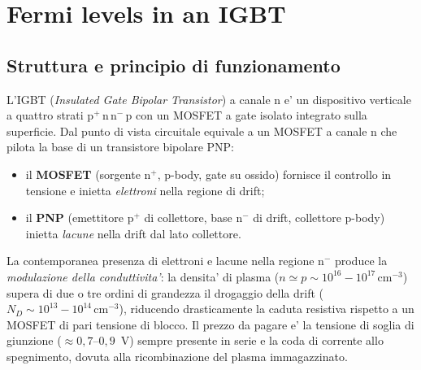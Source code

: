 \chapter{Fermi levels in an IGBT}
\label{ch:igbtfermi}
\vspace{-2.2\baselineskip}

\section{Struttura e principio di funzionamento}

L'IGBT (\emph{Insulated Gate Bipolar Transistor}) a canale n e' un dispositivo
verticale a quattro strati $\mathrm{p^{+}\,n\,n^{-}\,p}$ con un MOSFET a gate
isolato integrato sulla superficie. Dal punto di vista circuitale equivale a un
MOSFET a canale n che pilota la base di un transistore bipolare PNP:

\begin{itemize}[nosep,leftmargin=1.4em]
  \item il \textbf{MOSFET} (sorgente $\mathrm{n^{+}}$, p-body, gate su ossido)
        fornisce il controllo in tensione e inietta \emph{elettroni} nella
        regione di drift;
  \item il \textbf{PNP} (emettitore $\mathrm{p^{+}}$ di collettore, base
        $\mathrm{n^{-}}$ di drift, collettore p-body) inietta \emph{lacune}
        nella drift dal lato collettore.
\end{itemize}

La contemporanea presenza di elettroni e lacune nella regione $\mathrm{n^{-}}$
produce la \emph{modulazione della conduttivita'}: la densita' di plasma
($n \simeq p \sim 10^{16}\!-\!10^{17}\,\mathrm{cm^{-3}}$) supera di due o tre
ordini di grandezza il drogaggio della drift
($N_D \sim 10^{13}\!-\!10^{14}\,\mathrm{cm^{-3}}$), riducendo drasticamente la
caduta resistiva rispetto a un MOSFET di pari tensione di blocco. Il prezzo da
pagare e' la tensione di soglia di giunzione ($\approx 0{,}7$--$0{,}9$~V) sempre
presente in serie e la coda di corrente allo spegnimento, dovuta alla
ricombinazione del plasma immagazzinato.

